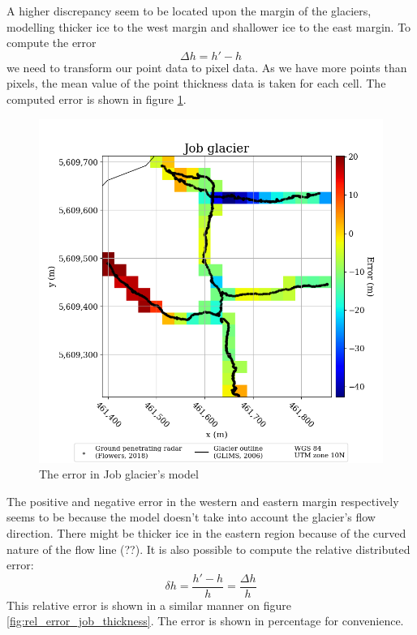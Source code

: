 \documentclass[a4, 12pt]{article}
\begin{document}
A higher discrepancy seem to be located upon the margin of the glaciers, modelling thicker ice to the west margin and shallower ice to the east margin. To compute the error \[\Delta h = h' - h\] we need to transform our point data to pixel data. As we have more points than pixels, the mean value of the point thickness data is taken for each cell. The computed error is shown in figure  \ref{fig:error_job_thickness}.
\begin{figure}[h!]
\centering
\includegraphics[scale=0.4]{../job_kluane_maps/Job glacier_error.png}
\caption{The error in Job glacier's model}
\label{fig:error_job_thickness}
\end{figure}
The positive and negative error in the western and eastern margin respectively seems to be because the model doesn't take into account the glacier's flow direction. There might be thicker ice in the eastern region because of the curved nature of the flow line (??). It is also possible to compute the relative distributed error: \[\delta h = \frac{h' - h}{h} = \frac{\Delta h}{h}\]
This relative error is shown in a similar manner on figure \ref{fig:rel_error_job_thickness}. The error is shown in percentage for convenience.
\end{document}
